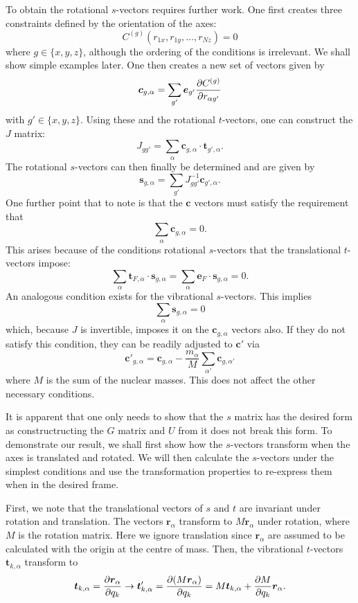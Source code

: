 \documentclass{article}
\newcommand{\vect}[1]{\boldsymbol{#1}}
\begin{document}
To obtain the rotational $s$-vectors requires further work. One first creates three constraints defined by the orientation of the axes: 
\[
C^{(g)}(r_{1x}, r_{1y}, \ldots, r_{Nz}) = 0
\]
where $g \in \{x,y,z\}$, although the ordering of the conditions is irrelevant. We shall show simple examples later. One then creates a new set of vectors given by 
\[
\vect{c}_{g, \alpha} = \sum_{g'}\vect{e}_{g'}\pdv{C^{(g)}}{r_{\alpha g'}}
\]
with $g' \in \{x,y,z\}$.  Using these and the rotational $t$-vectors, one can construct the $J$ matrix:  
\[
J_{g g'} = \sum_{\alpha} \vect{c}_{g, \alpha}\cdot  \vect{t}_{g', \alpha}.
\]
The rotational $s$-vectors can then finally be determined and are given by 
\[
\vect{s}_{g, \alpha} = \sum_{g'} J^{-1}_{g g'} \vect{c}_{g', \alpha}. 
\]
One further point that to note is that the $\vect{c}$ vectors must satisfy the requirement that
\[
\sum_{\alpha} \vect{c}_{g, \alpha} = 0.
\]
This arises because of the conditions rotational $s$-vectors that the translational $t$-vectors impose:
\[
\sum_\alpha \vect{t}_{F, \alpha}\cdot \vect{s}_{g, \alpha}  
= \sum_\alpha \vect{e}_F \cdot \vect{s}_{g, \alpha}= 0.
\]
An analogous condition exists for the vibrational $s$-vectors. This implies 
\[
\sum_\alpha \vect{s}_{g, \alpha} = 0
\]
which, because $J$ is invertible, imposes it on the $\vect{c}_{g, \alpha}$ vectors also. If they do not satisfy this condition, they can be readily adjusted to $\vect{c}'$ via
\[
\vect{c}'_{g, \alpha} = \vect{c}_{g, \alpha} -\frac{m_\alpha}{M} \sum_{\alpha'} \vect{c}_{g, \alpha'} 
\]
where $M$ is the sum of the nuclear masses. This does not affect the other necessary conditions. 

It is apparent that one only needs to show that the $s$ matrix has the desired form as constructructing the $G$ matrix and $U$ from it does not break this form. To demonstrate our result, we shall first show how the $s$-vectors transform when the axes is translated and rotated. We will then calculate the $s$-vectors under the simplest conditions and use the transformation properties to re-express them when in the desired frame. 

First, we note that the translational vectors of $s$ and $t$ are invariant under rotation and translation. The vectors $\vect{r}_\alpha$ transform to $M\vect{r}_\alpha$ under rotation, where $M$ is the rotation matrix. Here we ignore translation since $\vect{r}_\alpha$ are assumed to be calculated with the origin at the centre of mass. Then, the vibrational $t$-vectors $\vect{t}_{k, \alpha}$ transform to 
\[
\vect{t}_{k , \alpha} = \pdv{\vect{r}_\alpha}{q_k} \to \vect{t}'_{k, \alpha} = \pdv{(M\vect{r}_\alpha)}{q_k} = M \vect{t}_{k, \alpha} + \pdv{M}{q_k}\vect{r}_\alpha.
\]
\end{document}
